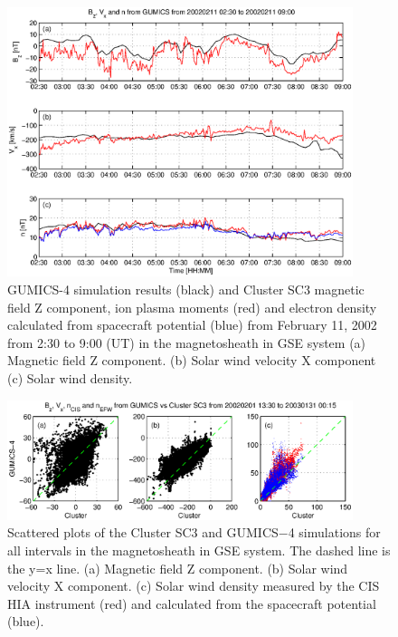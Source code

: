 \documentclass[linenumbers,draft]{agujournal}
\begin{document}
\begin{figure}[h]
\centering
\includegraphics[width=0.9\textwidth,angle=0]{swe-2020-corr-f08}  
\caption{GUMICS-4 simulation results (black) and Cluster SC3 magnetic field Z component, ion plasma moments (red) and electron density calculated from spacecraft potential (blue) from February 11, 2002 from 2:30 to 9:00 (UT) in the magnetosheath in GSE system  (a) Magnetic field Z component. (b) Solar wind velocity X component (c) Solar wind density.}
\label{fig:mshplot}
\end{figure}

\pagebreak

\begin{figure}[h]
\centering
\includegraphics[width=0.9\textwidth,angle=0]{swe-2020-corr-f09}
\caption{Scattered plots of the Cluster SC3 and GUMICS$-$4 simulations for all intervals in the magnetosheath in GSE system. The dashed line is the y=x line. (a) Magnetic field Z component. (b) Solar wind velocity X component. (c) Solar wind density measured by the CIS HIA instrument (red) and calculated from the spacecraft potential (blue).}
\label{fig:mshscatplot}
\end{figure}

\pagebreak
\end{document}
